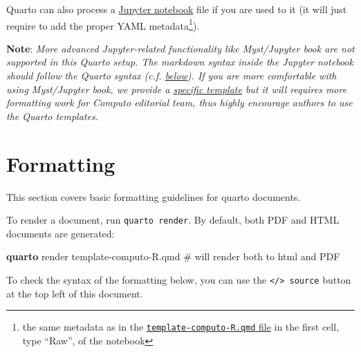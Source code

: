 \documentclass[
  11pt,
  a4paper,
]{article}
\newenvironment{Shaded}{}{}
\newcommand{\CommentTok}[1]{\textcolor[rgb]{0.42,0.45,0.49}{#1}}
\newcommand{\ExtensionTok}[1]{\textcolor[rgb]{0.84,0.23,0.29}{\textbf{#1}}}
\newcommand{\NormalTok}[1]{\textcolor[rgb]{0.14,0.16,0.18}{#1}}
\theoremstyle{plain}
\theoremstyle{remark}
\begin{document}
Quarto can also process a
\href{https://quarto.org/docs/get-started/hello/jupyter.html}{Jupyter
notebook} file if you are used to it (it will just require to add the
proper YAML metadata\footnote{the same metadata as in the
  \href{https://github.com/computorg/template-computo-R/blob/main/template-computo-R.qmd}{\texttt{template-computo-R.qmd}
  file} in the first cell, type ``Raw'', of the notebook}).

\textbf{Note}: \emph{More advanced Jupyter-related functionality like
Myst/Jupyter book are not supported in this Quarto setup. The markdown
syntax inside the Jupyter notebook should follow the Quarto syntax (c.f.
\hyperref[formatting]{below}). If you are more comfortable with using
Myst/Jupyter book, we provide a
\href{https://github.com/computorg/template-computo-myst}{specific
template} but it will requires more formatting work for Computo
editorial team, thus highly encourage authors to use the Quarto
templates.}

\section{Formatting}\label{formatting}

This section covers basic formatting guidelines for quarto documents.

To render a document, run \texttt{quarto\ render}. By default, both PDF
and HTML documents are generated:

\begin{Shaded}
\begin{Highlighting}[]
\ExtensionTok{quarto}\NormalTok{ render template{-}computo{-}R.qmd }\CommentTok{\# will render both to html and PDF}
\end{Highlighting}
\end{Shaded}

\begin{tcolorbox}[enhanced jigsaw, breakable, toptitle=1mm, arc=.35mm, bottomtitle=1mm, colback=white, colframe=quarto-callout-tip-color-frame, opacitybacktitle=0.6, colbacktitle=quarto-callout-tip-color!10!white, opacityback=0, toprule=.15mm, leftrule=.75mm, left=2mm, title=\textcolor{quarto-callout-tip-color}{\faLightbulb}\hspace{0.5em}{Note}, rightrule=.15mm, titlerule=0mm, bottomrule=.15mm, coltitle=black]

To check the syntax of the formatting below, you can use the
\texttt{\textless{}/\textgreater{}\ source} button at the top left of
this document.

\end{tcolorbox}
\end{document}
